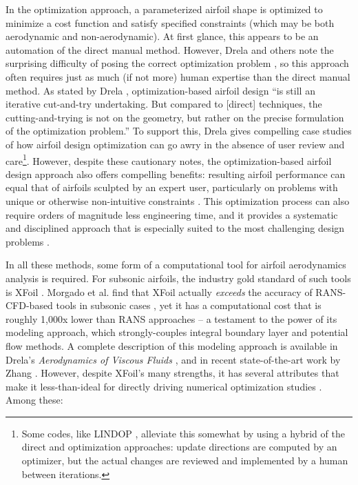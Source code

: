 In the optimization approach, a parameterized airfoil shape is optimized to minimize a cost function and satisfy specified constraints (which may be both aerodynamic and non-aerodynamic). At first glance, this appears to be an automation of the direct manual method. However, Drela and others note the surprising difficulty of posing the correct optimization problem \cite{drela_pros_1998, kroo_multidisciplinary_1997}, so this approach often requires just as much (if not more) human expertise than the direct manual method. As stated by Drela \cite{drela_pros_1998}, optimization-based airfoil design ``is still an iterative cut-and-try undertaking. But compared to [direct] techniques, the cutting-and-trying is not on the geometry, but rather on the precise formulation of the optimization problem.'' To support this, Drela gives compelling case studies of how airfoil design optimization can go awry in the absence of user review and care\footnote{Some codes, like LINDOP \cite{mses}, alleviate this somewhat by using a hybrid of the direct and optimization approaches: update directions are computed by an optimizer, but the actual changes are reviewed and implemented by a human between iterations.}. However, despite these cautionary notes, the optimization-based airfoil design approach also offers compelling benefits: resulting airfoil performance can equal that of airfoils sculpted by an expert user, particularly on problems with unique or otherwise non-intuitive constraints \cite{drela_pros_1998}. This optimization process can also require orders of magnitude less engineering time, and it provides a systematic and disciplined approach that is especially suited to the most challenging design problems \cite{he2019robust}.

In all these methods, some form of a computational tool for airfoil aerodynamics analysis is required. For subsonic airfoils, the industry gold standard of such tools is XFoil \cite{drela_xfoil_1989}. Morgado et al. find that XFoil actually \emph{exceeds} the accuracy of RANS-CFD-based tools in subsonic cases \cite{morgado2016xfoil}, yet it has a computational cost that is roughly 1,000x lower than RANS approaches -- a testament to the power of its modeling approach, which strongly-couples integral boundary layer and potential flow methods. A complete description of this modeling approach is available in Drela's \textit{Aerodynamics of Viscous Fluids} \cite{drela_aerodynamics_2019}, and in recent state-of-the-art work by Zhang \cite{zhang_threedimensional_2022, zhang_nonparametric_2017}. However, despite XFoil's many strengths, it has several attributes that make it less-than-ideal for directly driving numerical optimization studies \cite{adler_cfd_2022}. Among these:

